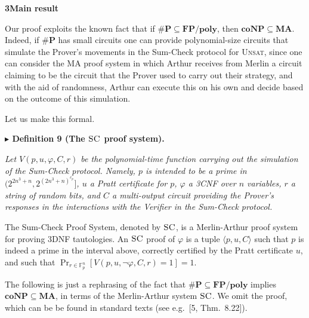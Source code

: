 \documentclass[11pt]{article}
\newcommand{\SC}{\textsc{SC}}
\newcommand{\Fpn}{\mathbb{F}_{p}^{n}}
\newenvironment{statement}[1]%
  {\par\medskip\noindent\textbf{#1}\par\nopagebreak\smallskip\noindent\itshape}%
  {\par\medskip}
\begin{document}
\medskip\noindent\textbf{3\quad Main result}

Our proof exploits the known fact that if $\#\mathbf{P} \subseteq \mathbf{FP}/\mathbf{poly}$,
then $\mathbf{coNP} \subseteq \mathbf{MA}$. Indeed, if $\#\mathbf{P}$ has small circuits one can
provide polynomial-size circuits that simulate the Prover's movements in the Sum-Check protocol
for \textsc{Unsat}, since one can consider the MA proof system in which Arthur receives from
Merlin a circuit claiming to be the circuit that the Prover used to carry out their strategy,
and with the aid of randomness, Arthur can execute this on his own and decide based on the
outcome of this simulation.

Let us make this formal.

\begin{statement}{$\blacktriangleright$ Definition 9 (The $\SC$ proof system).}
Let $V(p,u,\varphi,C,r)$ be the polynomial-time function carrying out the simulation of the
Sum-Check protocol. Namely, $p$ is intended to be a prime in
$(2^{2n^{3}+n}, 2^{(2n^{3}+n)^{c_{p}}}]$, $u$ a Pratt certificate for $p$, $\varphi$ a 3CNF
over $n$ variables, $r$ a string of random bits, and $C$ a multi-output circuit providing the
Prover's responses in the interactions with the Verifier in the Sum-Check protocol.

The Sum-Check Proof System, denoted by $\SC$, is a Merlin-Arthur proof system for proving
3DNF tautologies. An $\SC$ proof of $\varphi$ is a tuple $\langle p,u,C\rangle$ such that $p$ is
indeed a prime in the interval above, correctly certified by the Pratt certificate $u$, and such
that $\Pr_{r\in\Fpn}[V(p,u,\neg\varphi,C,r) = 1] = 1$.
\end{statement}


The following is just a rephrasing of the fact that $\#\mathbf{P} \subseteq \mathbf{FP}/\mathbf{poly}$
implies $\mathbf{coNP} \subseteq \mathbf{MA}$, in terms of the Merlin-Arthur system $\SC$. We
omit the proof, which can be be found in standard texts (see e.g.\ [5, Thm.\ 8.22]).

\end{document}
